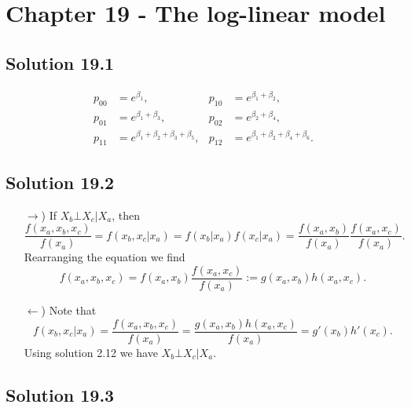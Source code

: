 \section*{Chapter 19 - The log-linear model}

\subsection*{Solution 19.1}

\begin{align*}
    p_{00} &= e^{\beta_1}, & p_{10} &= e^{\beta_1 + \beta_2}, \\
    p_{01} &= e^{\beta_1 + \beta_3}, & p_{02} &= e^{\beta_2 + \beta_4}, \\
    p_{11} &= e^{\beta_1 + \beta_2 + \beta_3 + \beta_5}, & p_{12} &= e^{\beta_1 + \beta_2 + \beta_4 + \beta_6}.
\end{align*}


\subsection*{Solution 19.2}

\begin{itemize}
    \item[$\rightarrow$)] If $X_b \bot X_c | X_a$, then
        \begin{equation*}
            \frac{f(x_a, x_b, x_c)}{f(x_a)}
                = f(x_b, x_c| x_a) = f(x_b|x_a) f(x_c|x_a)
                = \frac{f(x_a, x_b)}{f(x_a)} \frac{f(x_a, x_c)}{f(x_a)}.
        \end{equation*}
        Rearranging the equation we find
        \begin{equation*}
            f(x_a, x_b, x_c) = f(x_a, x_b) \frac{f(x_a, x_c)}{f(x_a)}
                := g(x_a, x_b) h(x_a, x_c).
        \end{equation*}
    \item[$\leftarrow$)] Note that
        \begin{equation*}
            f(x_b, x_c|x_a) = \frac{f(x_a, x_b, x_c)}{f(x_a)}
                = \frac{g(x_a, x_b) h(x_a, x_c)}{f(x_a)}
                = g'(x_b) h'(x_c).
        \end{equation*}
        Using solution 2.12 we have $X_b \bot X_c | X_a$.
\end{itemize}


\subsection*{Solution 19.3}

